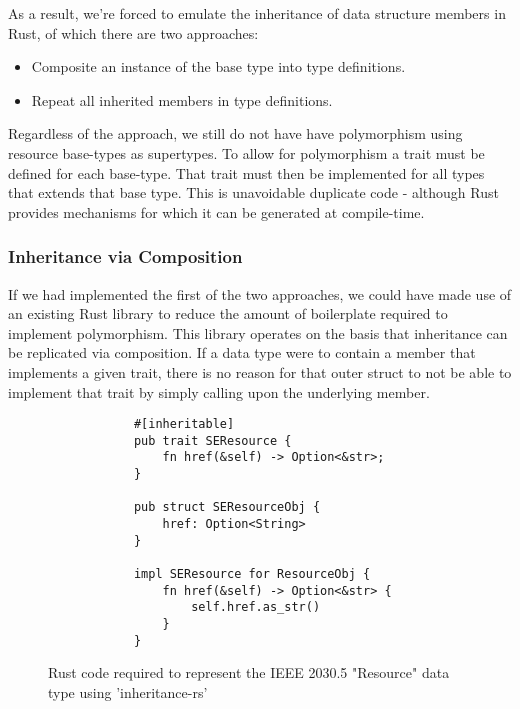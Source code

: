As a result, we're forced to emulate the inheritance of data structure members in Rust, of which there are two approaches:

\begin{itemize}
    \item Composite an instance of the base type into type definitions.
    \item Repeat all inherited members in type definitions.
\end{itemize}

Regardless of the approach, we still do not have have polymorphism using resource base-types as supertypes.
To allow for polymorphism a trait must be defined for each base-type. That trait must then be implemented for all types that extends that base type. 
This is unavoidable duplicate code - although Rust provides mechanisms for which it can be generated at compile-time.

\subsubsection{Inheritance via Composition}

If we had implemented the first of the two approaches, we could have made use of an existing Rust library to reduce the amount of boilerplate required to implement polymorphism.
This library operates on the basis that inheritance can be replicated via composition. If a data type were to contain a member that implements a given trait, there is no reason for that outer struct to not be able to implement that trait by simply calling upon the underlying member.


\begin{figure}[H]
    \begin{center}
        \begin{lstlisting}
            #[inheritable]
            pub trait SEResource {
                fn href(&self) -> Option<&str>;
            }

            pub struct SEResourceObj {
                href: Option<String>
            }

            impl SEResource for ResourceObj {
                fn href(&self) -> Option<&str> {
                    self.href.as_str()
                }
            }
        \end{lstlisting}
        \label{fig:resinher}
        \caption{Rust code required to represent the IEEE 2030.5 "Resource" data type using 'inheritance-rs'}
    \end{center}
\end{figure}


